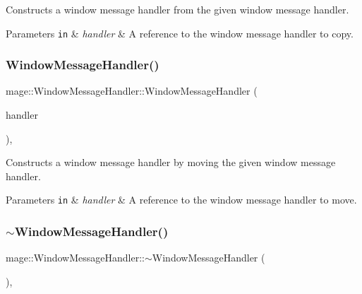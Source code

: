 Constructs a window message handler from the given window message handler.


\begin{DoxyParams}[1]{Parameters}
\mbox{\tt in}  & {\em handler} & A reference to the window message handler to copy. \\
\hline
\end{DoxyParams}
\hypertarget{classmage_1_1_window_message_handler_ab6fe3eac35ef7262941dae8e65841d88}{}\label{classmage_1_1_window_message_handler_ab6fe3eac35ef7262941dae8e65841d88} 
\subsubsection{\texorpdfstring{Window\+Message\+Handler()}{WindowMessageHandler()}\hspace{0.1cm}{\footnotesize\ttfamily [3/3]}}
{\footnotesize\ttfamily mage\+::\+Window\+Message\+Handler\+::\+Window\+Message\+Handler (\begin{DoxyParamCaption}\item[{\hyperlink{classmage_1_1_window_message_handler}{Window\+Message\+Handler} \&\&}]{handler }\end{DoxyParamCaption})\hspace{0.3cm}{\ttfamily [default]}, {\ttfamily [noexcept]}}

Constructs a window message handler by moving the given window message handler.


\begin{DoxyParams}[1]{Parameters}
\mbox{\tt in}  & {\em handler} & A reference to the window message handler to move. \\
\hline
\end{DoxyParams}
\hypertarget{classmage_1_1_window_message_handler_a24eae1a24e783b22fce2c7fdd8e14fef}{}\label{classmage_1_1_window_message_handler_a24eae1a24e783b22fce2c7fdd8e14fef} 
\subsubsection{\texorpdfstring{$\sim$\+Window\+Message\+Handler()}{~WindowMessageHandler()}}
{\footnotesize\ttfamily mage\+::\+Window\+Message\+Handler\+::$\sim$\+Window\+Message\+Handler (\begin{DoxyParamCaption}{ }\end{DoxyParamCaption})\hspace{0.3cm}{\ttfamily [virtual]}, {\ttfamily [default]}}

